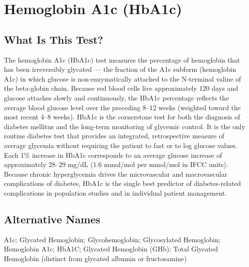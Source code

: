 \chapter{Hemoglobin A1c (HbA1c)}

\section*{What Is This Test?}
The hemoglobin A1c (HbA1c) test measures the percentage of hemoglobin that has been irreversibly glycated --- the fraction of the A1c subform (hemoglobin A1c) in which glucose is non-enzymatically attached to the N-terminal valine of the beta-globin chain. Because red blood cells live approximately 120 days and glucose attaches slowly and continuously, the HbA1c percentage reflects the average blood glucose level over the preceding 8--12 weeks (weighted toward the most recent 4--8 weeks). HbA1c is the cornerstone test for both the diagnosis of diabetes mellitus and the long-term monitoring of glycemic control. It is the only routine diabetes test that provides an integrated, retrospective measure of average glycemia without requiring the patient to fast or to log glucose values. Each 1\% increase in HbA1c corresponds to an average glucose increase of approximately 28--29 mg/dL (1.6 mmol/mol per mmol/mol in IFCC units). Because chronic hyperglycemia drives the microvascular and macrovascular complications of diabetes, HbA1c is the single best predictor of diabetes-related complications in population studies and in individual patient management.

\section*{Alternative Names}
A1c; Glycated Hemoglobin; Glycohemoglobin; Glycosylated Hemoglobin; Hemoglobin A1c; HbA1C; Glycated Hemoglobin (GHb); Total Glycated Hemoglobin (distinct from glycated albumin or fructosamine)

